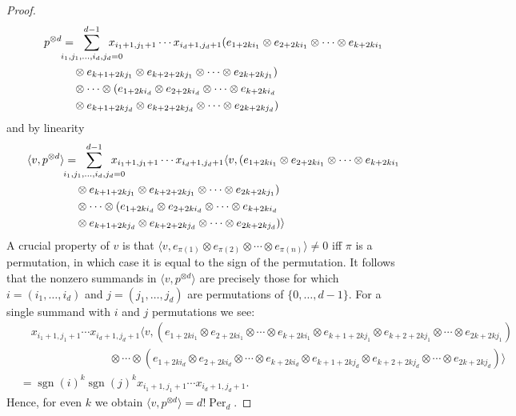 \documentclass[10pt,a4paper]{article}
\DeclareMathOperator{\per}{Per}
\DeclareMathOperator{\sgn}{sgn}
\begin{document}
\begin{proof}
{
\fontsize{10}{12}
\selectfont
\begin{align*}
\quad p^{\otimes d} &=\hspace{-.5cm}\sum_{i_1,j_1,\ldots,i_d,j_d=0}^{d-1}\hspace{-.5cm} x_{i_1+1,j_1+1} \cdots x_{i_d+1,j_d+1}
(e_{1+2ki_1} \otimes e_{2+2ki_1} \otimes \cdots \otimes e_{k+2ki_1}\\ &\quad{}\otimes e_{k+1+2kj_1} \otimes e_{k+2+2kj_1} \otimes \cdots \otimes e_{2k+2kj_1})\\ &\quad\otimes \cdots \otimes
(e_{1+2ki_d} \otimes e_{2+2ki_d} \otimes \cdots \otimes e_{k+2ki_d}\\ &\quad{}\otimes e_{k+1+2kj_d} \otimes e_{k+2+2kj_d} \otimes \cdots \otimes e_{2k+2kj_d})
\end{align*}
}
and by linearity
{
\fontsize{10}{12}
\selectfont
\begin{align*}
\quad \langle v,p^{\otimes d}\rangle &= \hspace{-.5cm}\sum_{i_1,j_1,\ldots,i_d,j_d=0}^{d-1}\hspace{-.5cm} x_{i_1+1,j_1+1} \cdots x_{i_d+1,j_d+1}
\langle v,(e_{1+2ki_1} \otimes e_{2+2ki_1} \otimes \cdots \otimes e_{k+2ki_1}\\ &\quad{}\otimes e_{k+1+2kj_1} \otimes e_{k+2+2kj_1} \otimes \cdots \otimes e_{2k+2kj_1})\\ &\quad\otimes \cdots \otimes
(e_{1+2ki_d} \otimes e_{2+2ki_d} \otimes \cdots \otimes e_{k+2ki_d}\\ &\quad{}\otimes e_{k+1+2kj_d} \otimes e_{k+2+2kj_d} \otimes \cdots \otimes e_{2k+2kj_d})\rangle
\end{align*}
}
A crucial property of $v$ is that $\langle v,e_{\pi(1)} \otimes e_{\pi(2)} \otimes \cdots \otimes e_{\pi(n)}\rangle \neq 0$ iff $\pi$ is a permutation, in which case it is equal to the sign of the permutation.
It follows that the nonzero summands in $\langle v,p^{\otimes d}\rangle$ are precisely those for which~$i=(i_1,\ldots,i_d)$ and $j=(j_1,\ldots,j_d)$ are permutations of $\{0,\ldots,d-1\}$.
For a single summand with $i$ and $j$ permutations we see:
\begin{align*}
&\quad x_{i_1+1,j_1+1} \cdots x_{i_d+1,j_d+1}
\langle v,(e_{1+2ki_1} \otimes e_{2+2ki_1} \otimes \cdots \otimes e_{k+2ki_1} \otimes e_{k+1+2kj_1} \otimes e_{k+2+2kj_1} \otimes \cdots \otimes e_{2k+2kj_1})\\ &\quad\quad\quad\quad\quad\quad\quad\quad\otimes \cdots \otimes
(e_{1+2ki_d} \otimes e_{2+2ki_d} \otimes \cdots \otimes e_{k+2ki_d} \otimes e_{k+1+2kj_d} \otimes e_{k+2+2kj_d} \otimes \cdots \otimes e_{2k+2kj_d})\rangle
\\&= \sgn(i)^k \sgn(j)^k x_{i_1+1,j_1+1} \cdots x_{i_d+1,j_d+1}.
\end{align*}
Hence, for even $k$ we obtain $\langle v,p^{\otimes d}\rangle = d! \per_d$.
\end{proof}
\end{document}

